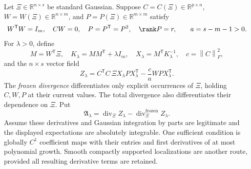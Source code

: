 \documentclass[11pt,oneside,openany,a4paper]{book}
\numberwithin{equation}{chapter}
\theoremstyle{definition}
\theoremstyle{remark}
\newcommand{\R}{\mathbb R}\newcommand{\E}{\mathbb E}\newcommand{\Prb}{\mathbb P}\newcommand{\PP}{\mathbb P}
\newcommand{\T}{\mathsf T}\newcommand{\Id}{I}
\newcommand{\F}[1]{\left\lVert#1\right\rVert_F}
\DeclareMathOperator{\diver}{div}\DeclareMathOperator{\vecop}{vec}\DeclareMathOperator{\Gammafun}{Gamma}
\begin{document}
Let $\Xi\in\R^{n\times s}$ be standard Gaussian. Suppose
$C=C(\Xi)\in\R^{p\times n}$, $W=W(\Xi)\in\R^{n\times m}$, and
$P=P(\Xi)\in\R^{m\times m}$ satisfy
\begin{equation}\label{base:eq:adaptive-reg-hyp}
 W^{\T}W=I_m,\quad CW=0,\quad P=P^{\T}=P^2,\quad \rank P=r,
 \qquad a=s-m-1>0.
\end{equation}
For $\lambda>0$, define
\begin{equation}\label{base:eq:regularized-design}
 M=W^{\T}\Xi,\quad K_\lambda=MM^{\T}+\lambda I_m,\quad
 X_\lambda=M^{\T}K_\lambda^{-1},\quad c=\F C^2,
\end{equation}
and the $n\times s$ vector field
\begin{equation}\label{base:eq:Stein-field}
 Z_\lambda=C^{\T}C\,\Xi X_\lambda P X_\lambda^{\T}
                   -\frac ca WPX_\lambda^{\T}.
\end{equation}
The \emph{frozen divergence} differentiates only explicit occurrences of
$\Xi$, holding $C,W,P$ at their current values. The total divergence also
differentiates their dependence on $\Xi$. Put
\begin{equation}\label{base:eq:Stein-charge}
 \mathfrak A_\lambda
 =\diver_\Xi Z_\lambda
       -\diver_\Xi^{\mathrm{frozen}}Z_\lambda.
\end{equation}
Assume these derivatives and Gaussian integration by parts are legitimate
and the displayed expectations are absolutely integrable. One sufficient
condition is globally $C^1$ coefficient maps with their entries and first
derivatives of at most polynomial growth. Smooth compactly supported
localizations are another route, provided all resulting derivative terms
are retained.
\end{document}
